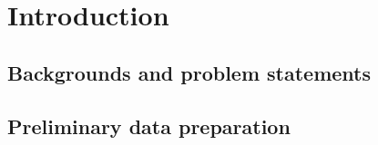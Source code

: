 \chapter{Introduction}

\section{Backgrounds and problem statements}

\section{Preliminary data preparation}